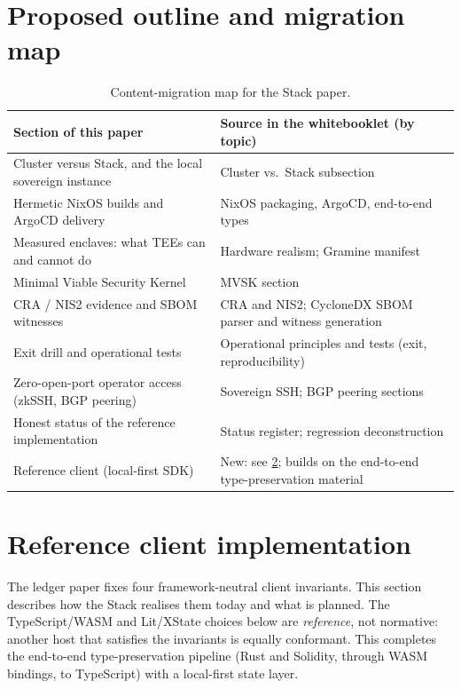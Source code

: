 \documentclass[a4paper,11pt,twoside,parskip=half-,headings=small]{scrartcl}
\begin{document}
\section{Proposed outline and migration map}
\begin{table}[H]
\centering\small
\begin{tabularx}{\textwidth}{@{}L{4.6cm}Y@{}}
\toprule
\textbf{Section of this paper} & \textbf{Source in the whitebooklet (by topic)} \\
\midrule
Cluster versus Stack, and the local sovereign instance & Cluster vs.\ Stack subsection \\
Hermetic NixOS builds and ArgoCD delivery & NixOS packaging, ArgoCD, end-to-end types \\
Measured enclaves: what TEEs can and cannot do & Hardware realism; Gramine manifest \\
Minimal Viable Security Kernel & MVSK section \\
CRA / NIS2 evidence and SBOM witnesses & CRA and NIS2; CycloneDX SBOM parser and witness generation \\
Exit drill and operational tests & Operational principles and tests (exit, reproducibility) \\
Zero-open-port operator access (zkSSH, BGP peering) & Sovereign SSH; BGP peering sections \\
Honest status of the reference implementation & Status register; regression deconstruction \\
Reference client (local-first SDK) & New: see \cref{sec:ref_client}; builds on the end-to-end type-preservation material \\
\bottomrule
\end{tabularx}
\caption{Content-migration map for the Stack paper.}
\end{table}

\section{Reference client implementation}
\label{sec:ref_client}

The ledger paper fixes four framework-neutral client invariants. This section describes how the Stack realises them today and what is planned. The TypeScript/WASM and Lit/XState choices below are \emph{reference}, not normative: another host that satisfies the invariants is equally conformant. This completes the end-to-end type-preservation pipeline (Rust and Solidity, through WASM bindings, to TypeScript) with a local-first state layer.
\end{document}

